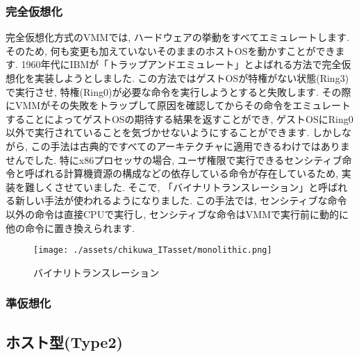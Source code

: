 \subsubsection{完全仮想化}
完全仮想化方式のVMMでは, ハードウェアの挙動をすべてエミュレートします. そのため, 何も変更も加えていないそのままのホストOSを動かすことができます. 1960年代にIBMが「トラップアンドエミュレート」とよばれる方法で完全仮想化を実装しようとしました. この方法ではゲストOSが特権がない状態(Ring3)で実行させ, 特権(Ring0)が必要な命令を実行しようとすると失敗します. その際にVMMがその失敗をトラップして原因を確認してからその命令をエミュレートすることによってゲストOSの期待する結果を返すことができ, ゲストOSにRing0以外で実行されていることを気づかせないようにすることができます. しかしながら, この手法は古典的ですべてのアーキテクチャに適用できるわけではありませんでした. 特にx86プロセッサの場合, ユーザ権限で実行できるセンシティブ命令と呼ばれる計算機資源の構成などの依存している命令が存在しているため, 実装を難しくさせていました. そこで, 「バイナリトランスレーション」と呼ばれる新しい手法が使われるようになりました. この手法では, センシティブな命令以外の命令は直接CPUで実行し, センシティブな命令はVMMで実行前に動的に他の命令に置き換えられます.
\begin{figure}[htbp]
    \centering
    \texttt{[image: ./assets/chikuwa\_ITasset/monolithic.png]}
    \caption{バイナリトランスレーション}
    \label{fig:one}
\end{figure}
\subsubsection{準仮想化}
\subsection{ホスト型(Type2)}
